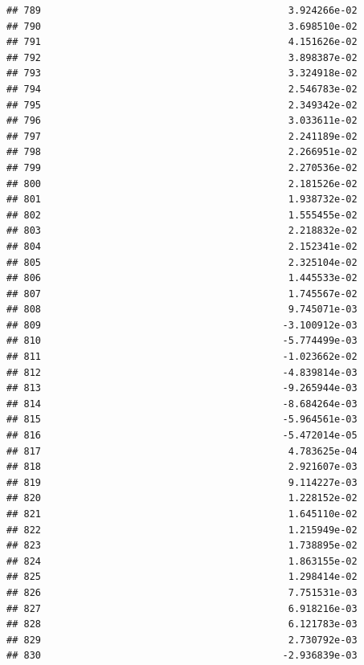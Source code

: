 \documentclass[
]{article}
\begin{document}
\begin{verbatim}
## 789                                           3.924266e-02
## 790                                           3.698510e-02
## 791                                           4.151626e-02
## 792                                           3.898387e-02
## 793                                           3.324918e-02
## 794                                           2.546783e-02
## 795                                           2.349342e-02
## 796                                           3.033611e-02
## 797                                           2.241189e-02
## 798                                           2.266951e-02
## 799                                           2.270536e-02
## 800                                           2.181526e-02
## 801                                           1.938732e-02
## 802                                           1.555455e-02
## 803                                           2.218832e-02
## 804                                           2.152341e-02
## 805                                           2.325104e-02
## 806                                           1.445533e-02
## 807                                           1.745567e-02
## 808                                           9.745071e-03
## 809                                          -3.100912e-03
## 810                                          -5.774499e-03
## 811                                          -1.023662e-02
## 812                                          -4.839814e-03
## 813                                          -9.265944e-03
## 814                                          -8.684264e-03
## 815                                          -5.964561e-03
## 816                                          -5.472014e-05
## 817                                           4.783625e-04
## 818                                           2.921607e-03
## 819                                           9.114227e-03
## 820                                           1.228152e-02
## 821                                           1.645110e-02
## 822                                           1.215949e-02
## 823                                           1.738895e-02
## 824                                           1.863155e-02
## 825                                           1.298414e-02
## 826                                           7.751531e-03
## 827                                           6.918216e-03
## 828                                           6.121783e-03
## 829                                           2.730792e-03
## 830                                          -2.936839e-03

\end{verbatim}
\end{document}
